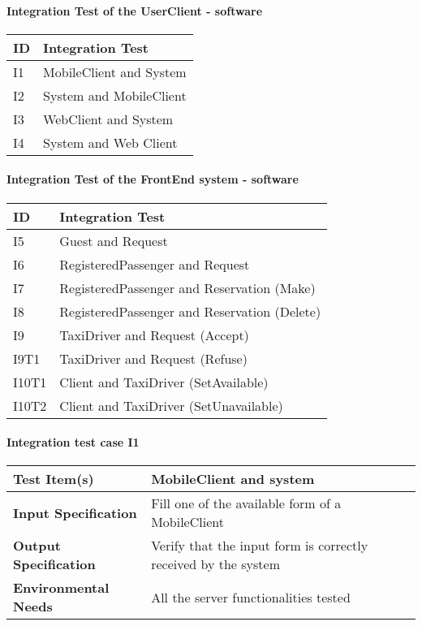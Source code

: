 \paragraph{Integration Test of the UserClient - software}
\begin{tabular}{l | l}
	\hline
	\textbf{ID} & \textbf{Integration Test} \\
	\hline
	I1 & MobileClient and System \\
	\hline
	I2 & System and MobileClient \\
	\hline
	I3 & WebClient and System \\
	\hline
	I4 & System and Web Client
	\hline
\end{tabular}
\paragraph{Integration Test of the FrontEnd system - software}
\begin{tabular}{l | l}
	\hline
	\textbf{ID} & \textbf{Integration Test} \\
	\hline
	I5 & Guest and Request \\
	\hline
	I6 & RegisteredPassenger and Request \\
	\hline
	I7 & RegisteredPassenger and Reservation (Make) \\
	\hline
	I8 & RegisteredPassenger and Reservation (Delete) \\
	\hline
	I9 & TaxiDriver and Request (Accept)\\
	\hile
	I9T1 & TaxiDriver and Request (Refuse)\\
	\hline
	I10T1 & Client and TaxiDriver (SetAvailable) \\
	\hline
	I10T2 & Client and TaxiDriver (SetUnavailable) \\
	\hline
\end{tabular}

\paragraph{Integration test case I1}
\begin{tabular}{l | l}
	\hline
	\textbf{Test Item(s)} & MobileClient and system \\
	\hline
	\textbf{Input Specification} & Fill one of the available form of a MobileClient \\
	\hline
	\textbf{Output Specification} & Verify that the input form is correctly received by the system \\
	\hline
	\textbf{Environmental Needs} & All the server functionalities tested \\
\end{tabular}

